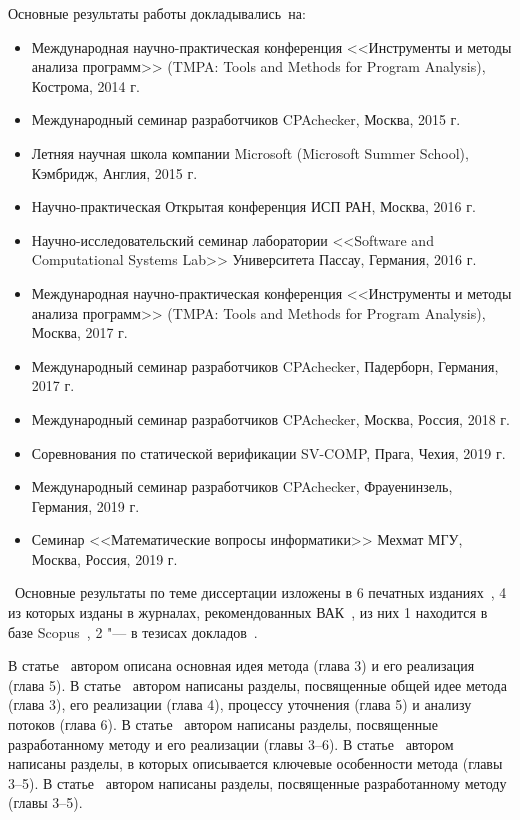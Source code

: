 {\probation}
Основные результаты работы докладывались~на:
\begin{itemize}
  \item Международная научно-практическая конференция <<Инструменты и методы анализа программ>> (TMPA: Tools and Methods for Program Analysis), Кострома, 2014 г.
  \item Международный семинар разработчиков CPAchecker, Москва, 2015 г.
  \item Летняя научная школа компании Microsoft (Microsoft Summer School), Кэмбридж, Англия, 2015 г.
  \item Научно-практическая Открытая конференция ИСП РАН, Москва, 2016 г.
  \item Научно-исследовательский семинар лаборатории <<Software and Computational Systems Lab>> Университета Пассау, Германия, 2016 г.
  \item Международная научно-практическая конференция <<Инструменты и методы анализа программ>> (TMPA: Tools and Methods for Program Analysis), Москва, 2017 г.
  \item Международный семинар разработчиков CPAchecker, Падерборн, Германия, 2017 г.
  \item Международный семинар разработчиков CPAchecker, Москва, Россия, 2018 г.
  \item Соревнования по статической верификации SV-COMP, Прага, Чехия, 2019 г.
  \item Международный семинар разработчиков CPAchecker, Фрауенинзель, Германия, 2019 г.
  \item Семинар <<Математические вопросы информатики>> Мехмат МГУ, Москва, Россия, 2019 г.
\end{itemize}


\publications\ Основные результаты по теме диссертации изложены в 6 печатных изданиях~\cite{lockatorVAK,lockatorVAK2,TMPA2017,theoryVAK,lockatorSyrcose,lockatorTMPA}, 
    4 из которых изданы в журналах, рекомендованных ВАК~\cite{lockatorVAK,lockatorVAK2,TMPA2017,theoryVAK}, из них 1 находится в базе Scopus~\cite{TMPA2017},
    2 "--- в тезисах докладов~\cite{lockatorSyrcose,lockatorTMPA}.

В статье~\cite{lockatorVAK} автором описана основная идея метода (глава 3) и его реализация (глава 5).
В статье~\cite{lockatorVAK2} автором написаны разделы, посвященные общей идее метода (глава 3), его реализации (глава 4), процессу уточнения (глава 5) и анализу потоков (глава 6).
В статье~\cite{TMPA2017} автором написаны разделы, посвященные разработанному методу и его реализации (главы 3--6).
В статье~\cite{lockatorSyrcose} автором написаны разделы, в которых описывается ключевые особенности метода (главы 3--5).
В статье~\cite{lockatorTMPA} автором написаны разделы, посвященные разработанному методу (главы 3--5).

